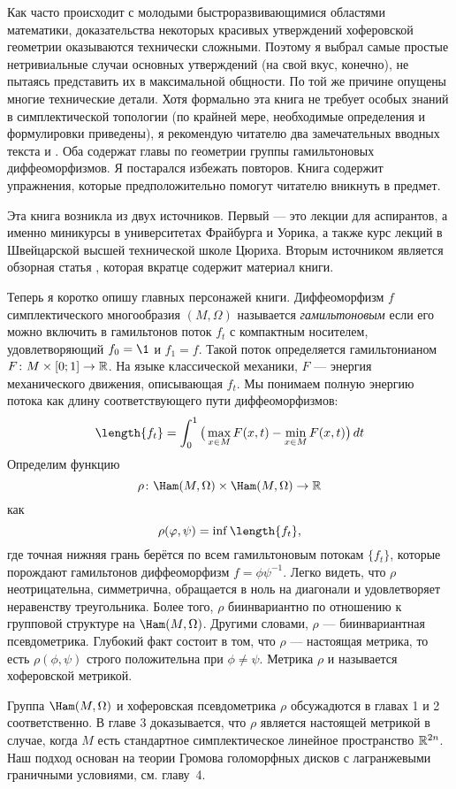 Как часто происходит с молодыми быстроразвивающимися областями математики, доказательства некоторых красивых утверждений хоферовской геометрии оказываются технически сложными.
Поэтому я выбрал самые простые нетривиальные случаи основных утверждений (на свой вкус, конечно), не пытаясь представить их в максимальной общности.
По той же причине опущены многие технические детали.
Хотя формально эта книга не требует особых знаний в симплектической топологии (по крайней мере, необходимые определения и формулировки приведены), я рекомендую читателю  два замечательных вводных текста \cite{HZ} и \cite{MS}.
Оба содержат главы по геометрии группы гамильтоновых диффеоморфизмов.
Я постарался избежать повторов.
Книга содержит упражнения, которые предположительно помогут читателю вникнуть в предмет.

Эта книга возникла из двух источников.
Первый — это лекции для аспирантов, а именно миникурсы в университетах Фрайбурга и Уорика, а также курс лекций в Швейцарской высшей технической школе Цюриха.
Вторым источником является обзорная статья \cite{P8}, которая вкратце содержит материал книги.

Теперь я коротко опишу главных персонажей книги.
Диффеоморфизм $f$ симплектического многообразия $(M,\Omega)$
называется \emph{гамильтоновым} если его можно включить в гамильтонов поток $f_t$ с компактным носителем, удовлетворяющий $f_0=\1$ и $f_1 =f$.
Такой поток определяется гамильтонианом $F\colon M \times [0;1] \to \mathbb{R}$.
На языке классической механики, $F$ — энергия механического движения, описывающая $f_t$.
Мы понимаем полную энергию потока как длину соответствующего пути диффеоморфизмов:
\[\length \{f_t\} =
\int_0^1\big(\max_{x\in M}F(x,t)-\min_{x\in M}F(x,t)\big)\, dt 
\]%
Определим функцию
\[\rho\: \Ham(M,\Omega) \times \Ham(M,\Omega) \to \RR\]
как
\[\rho (\phi, \psi) = \inf \length \{f_t\},\]
где точная нижняя грань берётся по всем гамильтоновым потокам $\{f_t\}$, которые
порождают гамильтонов диффеоморфизм $f = \phi\psi^{-1}$.
Легко видеть, что $\rho$ неотрицательна, симметрична, обращается в ноль на диагонали и удовлетворяет неравенству треугольника.
Более того, $\rho$ биинвариантно по отношению к групповой структуре на $\Ham(M,\Omega)$.
Другими словами, $\rho$ — биинвариантная псевдометрика.
Глубокий факт состоит в том, что $\rho$ — настоящая метрика, то есть $\rho (\phi, \psi)$ строго положительна при $\phi \ne \psi$.
Метрика $\rho$ и называется хоферовской метрикой.

Группа $\Ham(M,\Omega)$ и хоферовская псевдометрика $\rho$ обсужадются в главах 1 и 2 соответственно.
В главе 3 доказывается, что $\rho$ является настоящей метрикой в случае, когда $M$ есть стандартное симплектическое линейное пространство $\mathbb{R}^{2n}$.
Наш подход основан на теории Громова голоморфных дисков с лагранжевыми граничными условиями, см.
главу~4.

